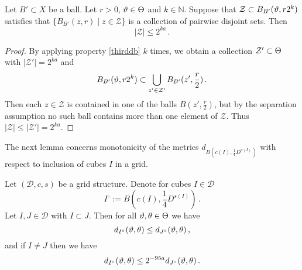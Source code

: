 \begin{lemma}
    \label{ball-metric-entropy}
    \leanok
    Let $B' \subset X$ be a ball. Let $r > 0$, ${\vartheta} \in {\Theta}$ and $k \in \mathbb{N}$. Suppose that $\mathcal{Z} \subset B_{B'}({\vartheta}, r2^k)$ satisfies that $\{B_{B'}(z,r)\mid z \in \mathcal{Z}\}$ is a collection of pairwise disjoint sets. Then
    $$ |\mathcal{Z}| \le 2^{ka}\,. $$
\end{lemma}

\begin{proof}
    \leanok
    By applying property \eqref{thirddb} $k$ times, we obtain a collection $\mathcal{Z}' \subset {\Theta}$ with $|\mathcal{Z}'| = 2^{ka}$ and
    $$
        B_{B'}({\vartheta},r2^k) \subset \bigcup_{z' \in \mathcal{Z}'} B_{B'}(z', \frac{r}{2})\,.
    $$
    Then each $z \in \mathcal{Z}$ is contained in one of the balls $B(z', \frac{r}{2})$, but by the separation assumption no such ball contains more than one element of $\mathcal{Z}$. Thus $|\mathcal{Z}| \le |\mathcal{Z}'| = 2^{ka}$.
\end{proof}

The next lemma concerns monotonicity of the metrics $d_{B(c(I), \frac 14 D^{s(I)})}$ with respect to inclusion of cubes $I$ in a grid.

\begin{lemma}
    \label{monotone-cube-metrics}
    \leanok
    Let $(\mathcal{D}, c, s)$ be a grid structure. Denote for cubes $I \in \mathcal{D}$
    $$
        I^\circ := B(c(I), \frac{1}{4} D^{s(I)})\,.
    $$
    Let $I, J \in \mathcal{D}$ with $I \subset J$.
    Then for all ${\vartheta}, {\theta} \in{\Theta}$ we have
    $$
        d_{I^\circ}({\vartheta}, {\theta}) \le d_{J^\circ}({\vartheta}, {\theta})\,,
    $$
    and if $I \ne J$ then we have
    $$
        d_{I^\circ}({\vartheta}, {\theta}) \le 2^{-95a} d_{J^\circ}({\vartheta}, {\theta})\,.
    $$
\end{lemma}

